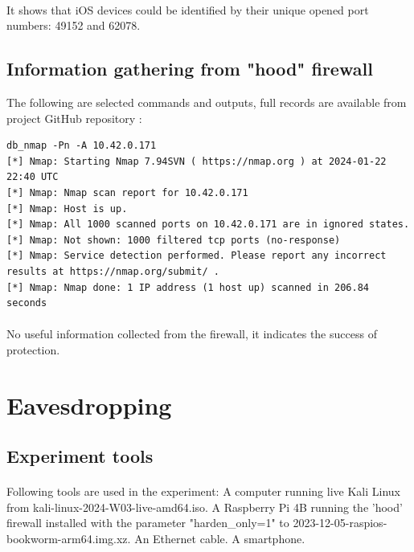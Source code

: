 \documentclass[mscthesis]{usiinfthesis}
\begin{document}
\paragraph{}
It shows that iOS devices could be identified by their unique opened port numbers: 49152 and 62078.

\subsection{Information gathering from "hood" firewall}
The following are selected commands and outputs, full records are available from project GitHub repository \citep{hood:github}:

\begin{lstlisting}[language={},frame=single,breaklines=true,postbreak=\mbox{\textcolor{red}{$\hookrightarrow$}\space}]
db_nmap -Pn -A 10.42.0.171
[*] Nmap: Starting Nmap 7.94SVN ( https://nmap.org ) at 2024-01-22 22:40 UTC
[*] Nmap: Nmap scan report for 10.42.0.171
[*] Nmap: Host is up.
[*] Nmap: All 1000 scanned ports on 10.42.0.171 are in ignored states.
[*] Nmap: Not shown: 1000 filtered tcp ports (no-response)
[*] Nmap: Service detection performed. Please report any incorrect results at https://nmap.org/submit/ .
[*] Nmap: Nmap done: 1 IP address (1 host up) scanned in 206.84 seconds
\end{lstlisting}
\paragraph{}
No useful information collected from the firewall, it indicates the success of protection.

\section{Eavesdropping}

\subsection{Experiment tools}
\paragraph{}
Following tools are used in the experiment: A computer running live Kali Linux from kali-linux-2024-W03-live-amd64.iso. A Raspberry Pi 4B running the 'hood' firewall installed with the parameter "harden\_only=1" to 2023-12-05-raspios-bookworm-arm64.img.xz. An Ethernet cable. A smartphone.
\end{document}
